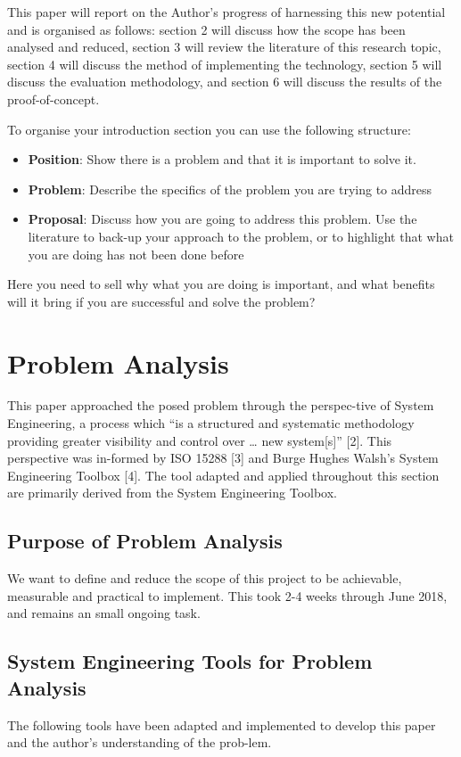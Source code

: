 \documentclass{UoNMCHA}
\numberwithin{equation}{section}
\begin{document}
This paper will report on the Author’s progress of harnessing this new potential and is organised as follows: section 2 will discuss how the scope has been analysed and reduced, section 3 will review the literature of this research topic, section 4 will discuss the method of implementing the technology, section 5 will discuss the evaluation methodology, and section 6 will discuss the results of the proof-of-concept.

To organise your introduction section you can use the following structure:
\begin{itemize}
    \item \textbf{Position}: Show there is a problem and that it is important to solve it.
    \item \textbf{Problem}: Describe the specifics of the problem you are trying to address
    \item \textbf{Proposal}: Discuss how you are going to address this problem. Use the literature to back-up your approach to the problem, or to highlight that what you are doing has not been done before
\end{itemize}
Here you need to sell why what you are doing is important, and what benefits will it bring if you are successful and solve the problem? 
%

\section{Problem Analysis}\label{sec:ProblemAnalysis}

This paper approached the posed problem through the perspec-tive of System Engineering, a process which “is a structured and systematic methodology providing greater visibility and control over … new system[s]” [2]. This perspective was in-formed by ISO 15288 [3] and Burge Hughes Walsh’s System Engineering Toolbox [4]. The tool adapted and applied throughout this section are primarily derived from the System Engineering Toolbox. 

\subsection{Purpose of Problem Analysis}
We want to define and reduce the scope of this project to be achievable, measurable and practical to implement. This took 2-4 weeks through June 2018, and remains an small ongoing task. 


\subsection{System Engineering Tools for Problem Analysis}
The following tools have been adapted and implemented to develop this paper and the author’s understanding of the prob-lem. 
\end{document}
